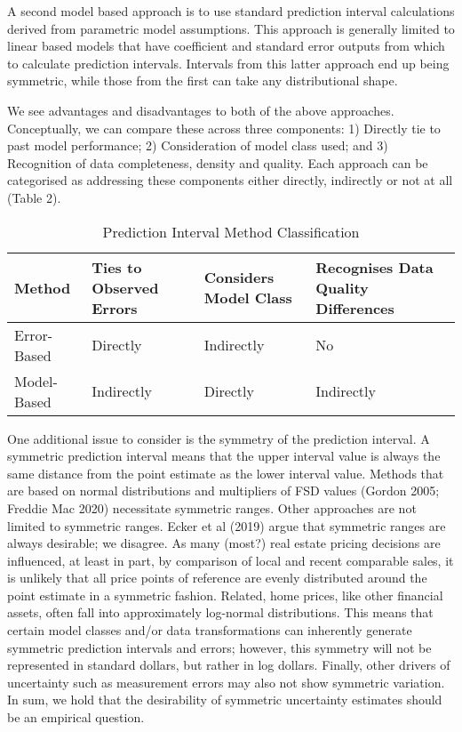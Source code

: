 \documentclass[colTwo]{anon}
\theoremstyle{definition}
\begin{document}
A second model based approach is to use standard prediction interval calculations derived from parametric model assumptions.  This approach is generally limited to linear based models that have coefficient and standard error outputs from which to calculate prediction intervals.  Intervals from this latter approach end up being symmetric, while those from the first can take any distributional shape.

We see advantages and disadvantages to both of the above approaches.   Conceptually, we can compare these across three components: 1) Directly tie to past model performance; 2) Consideration of model class used; and 3) Recognition of data completeness, density and quality.  Each approach can be categorised as addressing these components either directly, indirectly or not at all (Table 2).

\begin{table}[h!]
\centering
\begin{tabular}{|p{1.2cm} | p{1.6cm} | p{1.6cm} | p{1.6cm} |}
 \hline
  \textbf{Method} & \textbf{Ties to Observed Errors} & \textbf{Considers Model Class} & \textbf{Recognises Data Quality Differences} \\ [0.5ex]
 \hline
 Error-Based & Directly & Indirectly & No \\
 \hline
 Model-Based & Indirectly & Directly & Indirectly \\
 \hline
\end{tabular}
\caption{Prediction Interval Method Classification}
\label{table:2}
\end{table}

One additional issue to consider is the symmetry of the prediction interval. A symmetric prediction interval means that the upper interval value is always the same distance from the point estimate as the lower interval value.  Methods that are based on normal distributions and multipliers of FSD values (Gordon 2005; Freddie Mac 2020) necessitate symmetric ranges. Other approaches are not limited to symmetric ranges.  Ecker et al (2019) argue that symmetric ranges are always desirable; we disagree.  As many (most?) real estate pricing decisions are influenced, at least in part, by comparison of local and recent comparable sales, it is unlikely that all price points of reference are evenly distributed around the point estimate in a symmetric fashion.  Related, home prices, like other financial assets, often fall into approximately log-normal distributions.  This means that certain model classes and/or data transformations can inherently generate symmetric prediction intervals and errors; however, this symmetry will not be represented in standard dollars, but rather in log dollars. Finally, other drivers of uncertainty such as measurement errors may also not show symmetric variation.  In sum, we hold that the desirability of symmetric uncertainty estimates should be an empirical question.
\end{document}
